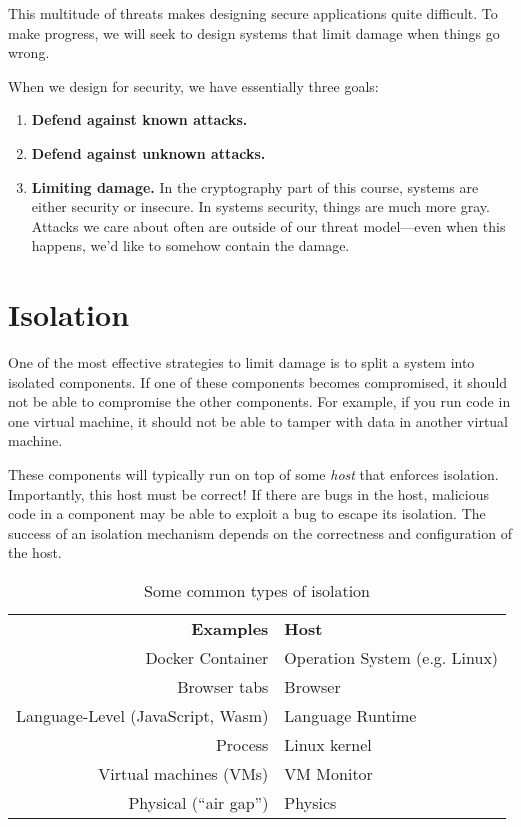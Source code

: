 This multitude of threats makes designing secure applications quite difficult. To make progress, we will seek to design systems that limit damage when things go wrong. 

When we design for security, we have essentially three goals:
\begin{enumerate}
\item \textbf{Defend against known attacks.}
\item \textbf{Defend against unknown attacks.}
\item \textbf{Limiting damage.} In the cryptography part of this course, systems
    are either security or insecure. In systems security, things are much more
    gray. Attacks we care about often are outside of our threat model---even
    when this happens, we'd like to somehow contain the damage.
\end{enumerate}


\section{Isolation}
One of the most effective strategies to limit damage is to split a system into isolated components. If one of these components becomes compromised, it should not be able to compromise the other components. 
For example, if you run code in one virtual machine, it should not be able to tamper with data in
another virtual machine.

These components will typically run on top of some \emph{host} that enforces isolation. Importantly, this host must be correct! If there are bugs in the host, malicious code in a component may be able to exploit a bug to escape its isolation.
The success of an isolation mechanism depends on the correctness 
and configuration of the host.

\begin{table}[htpb]
	\centering
	\caption{Some common types of isolation}
	\label{tab:isolationtypes}

	\begin{tabular}{rl}
		\textbf{Examples} & \textbf{Host} \\
		Docker Container & Operation System (e.g. Linux) \\
    Browser tabs & Browser\\
		Language-Level (JavaScript, Wasm) & Language Runtime \\
    Process & Linux kernel\\
    Virtual machines (VMs) & VM Monitor \\
		Physical (``air gap'') & Physics \\
	\end{tabular}
\end{table}


